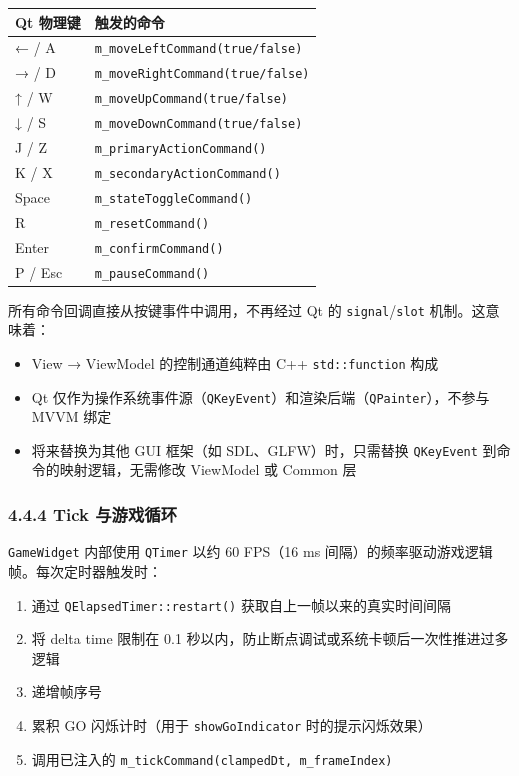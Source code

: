 \documentclass[12pt,fontset=none]{ctexart}
\begin{document}
\begin{longtable}{l l}
\toprule
\textbf{Qt 物理键} & \textbf{触发的命令} \\
\midrule
\endhead
← / A & \texttt{m\_moveLeftCommand(true/false)} \\
→ / D & \texttt{m\_moveRightCommand(true/false)} \\
↑ / W & \texttt{m\_moveUpCommand(true/false)} \\
↓ / S & \texttt{m\_moveDownCommand(true/false)} \\
J / Z & \texttt{m\_primaryActionCommand()} \\
K / X & \texttt{m\_secondaryActionCommand()} \\
Space & \texttt{m\_stateToggleCommand()} \\
R & \texttt{m\_resetCommand()} \\
Enter & \texttt{m\_confirmCommand()} \\
P / Esc & \texttt{m\_pauseCommand()} \\
\bottomrule
\end{longtable}

所有命令回调直接从按键事件中调用，不再经过 Qt 的 \texttt{signal}/\texttt{slot} 机制。这意味着：

\begin{itemize}
\item View → ViewModel 的控制通道纯粹由 C++ \texttt{std::function} 构成
\item Qt 仅作为操作系统事件源（\texttt{QKeyEvent}）和渲染后端（\texttt{QPainter}），不参与 MVVM 绑定
\item 将来替换为其他 GUI 框架（如 SDL、GLFW）时，只需替换 \texttt{QKeyEvent} 到命令的映射逻辑，无需修改 ViewModel 或 Common 层
\end{itemize}

\subsubsection{4.4.4 Tick 与游戏循环}

\texttt{GameWidget} 内部使用 \texttt{QTimer} 以约 60 FPS（16 ms 间隔）的频率驱动游戏逻辑帧。每次定时器触发时：

\begin{enumerate}
\item 通过 \texttt{QElapsedTimer::restart()} 获取自上一帧以来的真实时间间隔
\item 将 delta time 限制在 0.1 秒以内，防止断点调试或系统卡顿后一次性推进过多逻辑
\item 递增帧序号
\item 累积 GO 闪烁计时（用于 \texttt{showGoIndicator} 时的提示闪烁效果）
\item 调用已注入的 \texttt{m\_tickCommand(clampedDt, m\_frameIndex)}
\end{enumerate}
\end{document}
